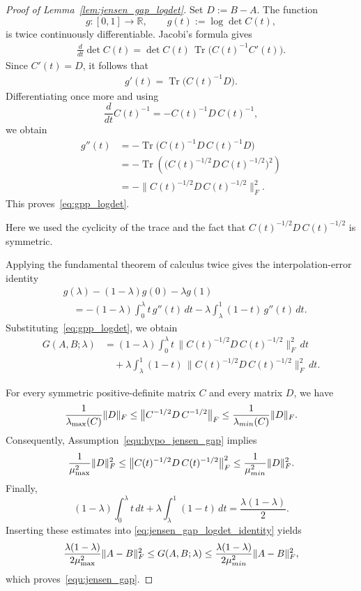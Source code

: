 \documentclass[10pt,a4paper]{amsart}
\DeclareMathOperator{\Tr}{Tr}
\def\min{{\rm min}}
\begin{document}
\begin{proof}[Proof of Lemma~\ref{lem:jensen_gap_logdet}]
Set \(D:=B-A\). The function
\[
g:[0,1]\to\mathbb{R},
\qquad
g(t):=\log\det C(t),
\]
is twice continuously differentiable. Jacobi's formula gives
\begin{align}\label{equ:Jacobi_formula}
\frac{d}{dt}\det C(t)
=
\det C(t)\,
\Tr\!\bigl(C(t)^{-1}C'(t)\bigr).
\end{align}
Since \(C'(t)=D\), it follows that
\begin{align}\label{eq:gp_logdet}
g'(t)
=
\Tr\!\bigl(C(t)^{-1}D\bigr).
\end{align}
Differentiating once more and using
\[
\frac{d}{dt}C(t)^{-1}
=
-C(t)^{-1}D\,C(t)^{-1},
\]
we obtain
\begin{align*}
g''(t)
&=
-\Tr\!\bigl(C(t)^{-1}D\,C(t)^{-1}D\bigr) \\
&=
-\Tr\!\left(
  \bigl(C(t)^{-1/2}D\,C(t)^{-1/2}\bigr)^2
 \right) \\
&=
-\bigl\|
 C(t)^{-1/2}D\,C(t)^{-1/2}
 \bigr\|_F^2.
\end{align*}
This proves~\eqref{eq:gpp_logdet}.\par\noindent Here we used the cyclicity of the trace and the fact that
\(C(t)^{-1/2}D\,C(t)^{-1/2}\) is symmetric.

Applying the fundamental theorem of calculus twice gives the
interpolation-error identity
\begin{align}
&g(\lambda)-(1-\lambda)g(0)-\lambda g(1) \nonumber\\
&\quad=
-(1-\lambda)\int_0^\lambda t\,g''(t)\,dt
-\lambda\int_\lambda^1(1-t)\,g''(t)\,dt.
\end{align}
Substituting~\eqref{eq:gpp_logdet}, we obtain
\begin{align}
G(A,B;\lambda)
&=
(1-\lambda)\int_0^\lambda
t\,
\bigl\|
 C(t)^{-1/2}D\,C(t)^{-1/2}
\bigr\|_F^2\,dt \nonumber\\
&\quad+
\lambda\int_\lambda^1
(1-t)\,
\bigl\|
 C(t)^{-1/2}D\,C(t)^{-1/2}
\bigr\|_F^2\,dt.
\label{eq:jensen_gap_logdet_identity}
\end{align}

For every symmetric positive-definite matrix \(C\) and every matrix
\(D\), we have
\begin{align}\label{equ:frobenius_operator_norm_estimate}
\frac{1}{\lambda_{\max}(C)}
\|D\|_F
\leq
\bigl\|C^{-1/2}D\,C^{-1/2}\bigr\|_F
\leq
\frac{1}{\lambda_{\min}(C)}
\|D\|_F.
\end{align}
Consequently, Assumption~\eqref{equ:hypo_jensen_gap} implies
\[
\frac{1}{\mu_{\max}^2}\|D\|_F^2
\leq
\bigl\|C(t)^{-1/2}D\,C(t)^{-1/2}\bigr\|_F^2
\leq
\frac{1}{\mu_{\min}^2}\|D\|_F^2.
\]
Finally,
\[
(1-\lambda)\int_0^\lambda t\,dt
+
\lambda\int_\lambda^1(1-t)\,dt
=
\frac{\lambda(1-\lambda)}{2}.
\]
Inserting these estimates into
\eqref{eq:jensen_gap_logdet_identity} yields
\[
\frac{\lambda(1-\lambda)}{2\mu_{\max}^2}
\|A-B\|_F^2
\leq
G(A,B;\lambda)
\leq
\frac{\lambda(1-\lambda)}{2\mu_{\min}^2}
\|A-B\|_F^2,
\]
which proves~\eqref{equ:jensen_gap}.
\end{proof}
\end{document}
